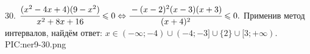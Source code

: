 30. $\cfrac{(x^2-4x+4)(9-x^2)}{x^2+8x+16}\leqslant0\Leftrightarrow\cfrac{-(x-2)^2(x-3)(x+3)}{(x+4)^2}\leqslant0.$ Применив метод интервалов, найдём ответ: $x\in
(-\infty;-4)\cup(-4;-3]\cup\{2\}\cup[3;+\infty).$
{{PIC:ner9-30.png}}\\
